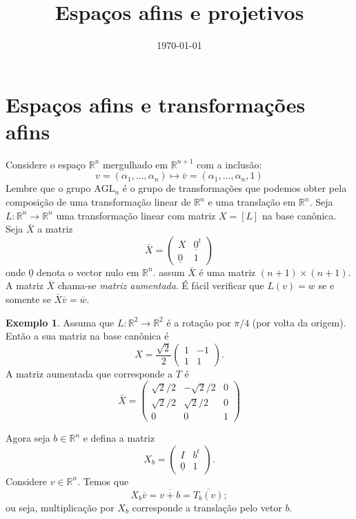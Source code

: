 \documentclass[12pt]{amsart}
\newcommand{\R}{\mathbb R}
\theoremstyle{definition}
\newtheorem{example}[theorem]{Exemplo}
\newcommand{\agl}{\mbox{AGL}}
\begin{document}
\date{\today}
\title[Quatérnios]{Espaços afins e projetivos}
\maketitle

\section{Espaços afins e transformações afins}

Considere o espaço $\R^n$ mergulhado em $\R^{n+1}$ com a inclusão:
\[
    v=(\alpha_1,\ldots,\alpha_n)\mapsto \overline v=(\alpha_1,\ldots,\alpha_n,1)
\]
Lembre que o grupo $\agl_n$ é o grupo de transformações que podemos obter pela composição de uma 
transformação linear de $\R^n$ e uma translação em $\R^n$. 
Seja $L:\R^n\to \R^n$ uma transformação linear com matriz $X=[L]$ na base canônica. Seja $\bar X$ a 
matriz 
\[ 
    \bar X=\begin{pmatrix} X & \underline 0^t\\ \underline 0 & 1\end{pmatrix} 
\]
onde $\underline 0$ denota o vector nulo em $\R^n$. assum $\bar X$ é uma matriz 
$(n+1)\times(n+1)$. A matriz $\bar X$ chama-se \emph{matriz aumentada}.
É fácil verificar que $L(v)=w$ se e somente se $\bar X\bar v = \bar w$. 
\begin{example}
    Assuma que $L:\R^2\to\R^2$ é a rotação por $\pi/4$ (por volta da origem). 
    Então a sua matriz na base canônica é 
    \[
        X=\frac{\sqrt 2}{2}\begin{pmatrix} 1 & -1\\ 1 & 1\end{pmatrix}.
    \]
    A matriz aumentada que corresponde a $T$ é 
    \[
        \bar X=\begin{pmatrix} \sqrt 2/2 & -\sqrt 2/2 & 0 \\ \sqrt 2/2 & \sqrt 2/2 & 0 \\ 0 & 0 & 1
        \end{pmatrix}
    \]
\end{example}

Agora seja $b\in\R^n$ e defina a matriz 
\[
    X_b=\begin{pmatrix} I & b^t \\ \underline 0 & 1\end{pmatrix}.
\]
Considere $v\in\R^n$. Temos que 
\[
    X_b\bar v=\overline{v+b}=\overline{T_b(v)};
\]
ou seja, multiplicação por $X_b$ corresponde a translação pelo vetor $b$. 
\end{document}
